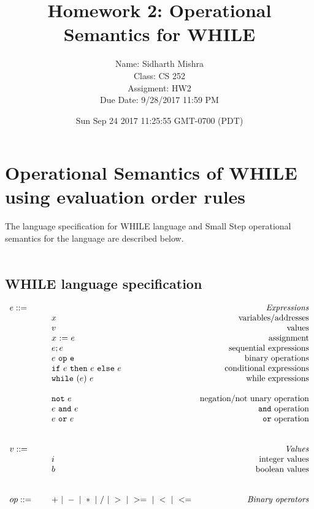 \documentclass{article}
\title{Homework 2: Operational Semantics for WHILE}
\author{
  Name: Sidharth Mishra \\
  Class: CS 252 \\
  Assigment: HW2 \\
  Due Date: 9/28/2017 11:59 PM \\
  }
\date{Sun Sep 24 2017 11:25:55 GMT-0700 (PDT)}
\begin{document}
\maketitle

\section{Operational Semantics of WHILE using evaluation order rules}

\newcommand{\mydefhead}[2]{\multicolumn{2}{l}{{#1}}&\mbox{\emph{#2}}\\}
\newcommand{\mydefcase}[2]{\qquad\qquad& #1 &\mbox{#2}\\}

\newcommand{\assign}[2]{#1~{:=}~#2}
\newcommand{\ife}[3]{\mbox{\tt if}~{#1}~\mbox{\tt then}~{#2}~\mbox{\tt else}~{#3}}
\newcommand{\whilee}[2]{\mbox{\tt while}~(#1)~#2}
\newcommand{\true}{\mbox{\tt true}}
\newcommand{\false}{\mbox{\tt false}}
\newcommand{\enot}[1]{\mbox{\tt not}~{#1}}
\newcommand{\eand}[2]{{#1}~\mbox{\tt and}~{#2}}
\newcommand{\eor}[2]{{#1}~\mbox{\tt or}~{#2}}

The language specification for WHILE language and Small Step operational semantics for the language are described below.
\\
\\
\subsection{WHILE language specification}

\[
  \begin{array}{llr}
    \mydefhead{e ::=\qquad\qquad\qquad\qquad}{Expressions}
    \mydefcase{x}{variables/addresses}
    \mydefcase{v}{values}
    \mydefcase{\assign x e}{assignment}
    \mydefcase{e; e}{sequential expressions}
    \mydefcase{e ~ \tt op ~ e}{binary operations}
    \mydefcase{\ife e e e}{conditional expressions}
    \mydefcase{\whilee e e}{while expressions}
    \\
    \mydefcase{\enot e}{negation/not unary operation}
    \mydefcase{\eand e e}{{\tt and} operation}
    \mydefcase{\eor e e}{{\tt or} operation}

    \\
    \\
    \mydefhead{v ::=\qquad\qquad\qquad\qquad}{Values}
    \mydefcase{i}{integer values}
    \mydefcase{b}{boolean values}

    \\
    \\
    op ::= & + ~|~ - ~|~ * ~|~ / ~|~ > ~|~ >= ~|~ < ~|~ <= & \mbox{\emph{Binary operators}} \\
  \end{array}
\]
\\
\\
\end{document}
